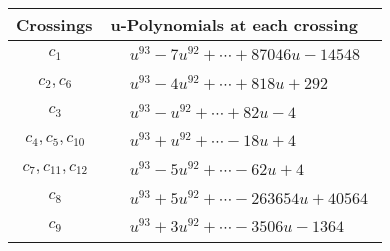 \documentclass[1p]{elsarticle_modified}
\theoremstyle{definition}
\begin{document}
\begin{tabular}{m{50pt}|m{274pt}}
Crossings & \hspace{64pt}u-Polynomials at each crossing \\
\hline $$\begin{aligned}c_{1}\end{aligned}$$&$\begin{aligned}
&u^{93}-7 u^{92}+\cdots+87046 u-14548
\end{aligned}$\\
\hline $$\begin{aligned}c_{2},c_{6}\end{aligned}$$&$\begin{aligned}
&u^{93}-4 u^{92}+\cdots+818 u+292
\end{aligned}$\\
\hline $$\begin{aligned}c_{3}\end{aligned}$$&$\begin{aligned}
&u^{93}- u^{92}+\cdots+82 u-4
\end{aligned}$\\
\hline $$\begin{aligned}c_{4},c_{5},c_{10}\end{aligned}$$&$\begin{aligned}
&u^{93}+u^{92}+\cdots-18 u+4
\end{aligned}$\\
\hline $$\begin{aligned}c_{7},c_{11},c_{12}\end{aligned}$$&$\begin{aligned}
&u^{93}-5 u^{92}+\cdots-62 u+4
\end{aligned}$\\
\hline $$\begin{aligned}c_{8}\end{aligned}$$&$\begin{aligned}
&u^{93}+5 u^{92}+\cdots-263654 u+40564
\end{aligned}$\\
\hline $$\begin{aligned}c_{9}\end{aligned}$$&$\begin{aligned}
&u^{93}+3 u^{92}+\cdots-3506 u-1364
\end{aligned}$\\
\hline
\end{tabular}\\~\\
\newpage\renewcommand{\arraystretch}{1}
\end{document}
